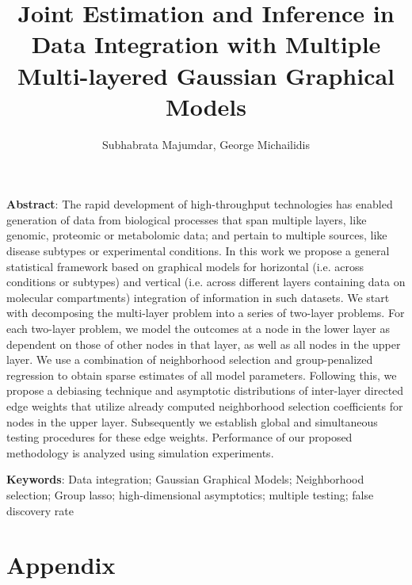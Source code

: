 \documentclass[11pt,letterpaper]{article}
\numberwithin{equation}{section}
\begin{document}
\newtheorem{Theorem}{Theorem}[section]
\newtheorem{Lemma}[Theorem]{Lemma}
\newtheorem{Corollary}[Theorem]{Corollary}
\newtheorem{Proposition}[Theorem]{Proposition}
\newtheorem{Conjecture}[Theorem]{Conjecture}
\theoremstyle{definition} \newtheorem{Definition}[Theorem]{Definition}
\newtheorem{Example}{Example}[section]
\newtheorem{Algorithm}{Algorithm}
\newtheorem{Remark}{Remark}

\title{Joint Estimation and Inference in Data Integration with Multiple Multi-layered Gaussian Graphical Models}
\date{}
\author{Subhabrata Majumdar, George Michailidis}
\maketitle

\noindent\textbf{Abstract}: 
The rapid development of high-throughput technologies has enabled generation of data from biological processes that span multiple layers, like genomic, proteomic or metabolomic data; and pertain to multiple sources, like disease subtypes or experimental conditions. In this work we propose a general statistical framework based on graphical models for horizontal (i.e. across conditions or subtypes) and vertical (i.e. across different layers containing data on molecular compartments) integration of information in such datasets. We start with decomposing the multi-layer problem into a series of two-layer problems. For each two-layer problem, we model the outcomes at a node in the lower layer as dependent on those of other nodes in that layer, as well as all nodes in the upper layer. We use a combination of neighborhood selection and group-penalized regression to obtain sparse estimates of all model parameters. Following this, we propose a debiasing technique and asymptotic distributions of inter-layer directed edge weights that utilize already computed neighborhood selection coefficients for nodes in the upper layer. Subsequently we establish global and simultaneous testing procedures for these edge weights. Performance of our proposed methodology is analyzed using simulation experiments.

\vspace{.5cm}
\noindent\textbf{Keywords}: Data integration; Gaussian Graphical Models; Neighborhood selection; Group lasso; high-dimensional asymptotics; multiple testing; false discovery rate

\newpage







\newpage
\appendix
\section*{Appendix}





%

\end{document}
